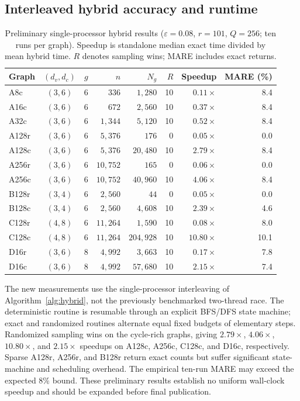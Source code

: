 \subsection{Interleaved hybrid accuracy and runtime}
\begin{table}[!ht]
\centering
\caption{Preliminary single-processor hybrid results
($\varepsilon=0.08$, $r=101$, $Q=256$; ten runs per graph).
Speedup is standalone median exact time divided by mean
hybrid time. $R$ denotes sampling wins; MARE includes exact returns.}
\label{tab:hybrid-exp}
\footnotesize
\setlength{\tabcolsep}{3.3pt}
\begin{tabular}{lccrrrrr}
\hline
Graph & $(d_v,d_c)$ & $g$ & $n$ & $N_g$ & $R$ & Speedup & MARE (\%)\\
\hline
A8c & $(3,6)$ & 6 & $336$ & $1,280$ & 10 & $0.11\times$ & 8.4\\
A16c & $(3,6)$ & 6 & $672$ & $2,560$ & 10 & $0.37\times$ & 8.4\\
A32c & $(3,6)$ & 6 & $1,344$ & $5,120$ & 10 & $0.52\times$ & 8.4\\
A128r & $(3,6)$ & 6 & $5,376$ & $176$ & 0 & $0.05\times$ & 0.0\\
A128c & $(3,6)$ & 6 & $5,376$ & $20,480$ & 10 & $2.79\times$ & 8.4\\
A256r & $(3,6)$ & 6 & $10,752$ & $165$ & 0 & $0.06\times$ & 0.0\\
A256c & $(3,6)$ & 6 & $10,752$ & $40,960$ & 10 & $4.06\times$ & 8.4\\
B128r & $(3,4)$ & 6 & $2,560$ & $44$ & 0 & $0.05\times$ & 0.0\\
B128c & $(3,4)$ & 6 & $2,560$ & $4,608$ & 10 & $2.39\times$ & 4.6\\
C128r & $(4,8)$ & 6 & $11,264$ & $1,590$ & 10 & $0.08\times$ & 8.0\\
C128c & $(4,8)$ & 6 & $11,264$ & $204,928$ & 10 & $10.80\times$ & 10.1\\
D16r & $(3,6)$ & 8 & $4,992$ & $3,663$ & 10 & $0.17\times$ & 7.8\\
D16c & $(3,6)$ & 8 & $4,992$ & $57,680$ & 10 & $2.15\times$ & 7.4\\
\hline
\end{tabular}
\end{table}
The new measurements use the single-processor interleaving
of Algorithm~\ref{alg:hybrid}, not the previously benchmarked
two-thread race. The deterministic routine is resumable through
an explicit BFS/DFS state machine; exact and randomized routines
alternate equal fixed budgets of elementary steps.
Randomized sampling wins on the cycle-rich graphs, giving
$2.79\times$, $4.06\times$, $10.80\times$, and $2.15\times$
speedups on A128c, A256c, C128c, and D16c, respectively.
Sparse A128r, A256r, and B128r return exact counts but suffer
significant state-machine and scheduling overhead. The
empirical ten-run MARE may exceed the expected $8\%$ bound.
These preliminary results establish no uniform wall-clock
speedup and should be expanded before final publication.
